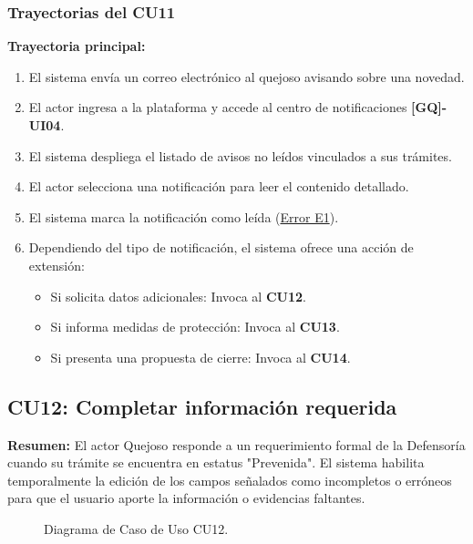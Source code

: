 \begin{appendices}
\subsubsection{Trayectorias del CU11}
\textbf{Trayectoria principal:}
\begin{enumerate}[nosep]
    \item El sistema envía un correo electrónico al quejoso avisando sobre una novedad.
    \item El actor ingresa a la plataforma y accede al centro de notificaciones \textbf{[GQ]-UI04}.
    \item El sistema despliega el listado de avisos no leídos vinculados a sus trámites.
    \item El actor selecciona una notificación para leer el contenido detallado.
    \item El sistema marca la notificación como leída (\hyperlink{err:E16}{Error E1}).
    \item Dependiendo del tipo de notificación, el sistema ofrece una acción de extensión:
    \begin{itemize}[nosep]
        \item Si solicita datos adicionales: Invoca al \textbf{CU12}.
        \item Si informa medidas de protección: Invoca al \textbf{CU13}.
        \item Si presenta una propuesta de cierre: Invoca al \textbf{CU14}.
    \end{itemize}
\end{enumerate}

\newpage

\subsection{CU12: Completar información requerida}

\textbf{Resumen:} 
El actor Quejoso responde a un requerimiento formal de la Defensoría cuando su trámite se encuentra en estatus "Prevenida". El sistema habilita temporalmente la edición de los campos señalados como incompletos o erróneos para que el usuario aporte la información o evidencias faltantes.

\begin{figure}[htbp]
    \centering
    \figCUdoce
    \caption{Diagrama de Caso de Uso CU12.}
    \label{fig:cu12}
\end{figure}


\end{appendices}
